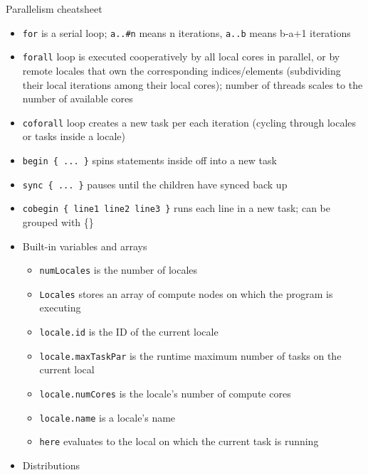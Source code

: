 \documentclass[10pt,xcolor=pdftex,dvipsnames,table]{beamer}
\newcommand{\tc}{\textcolor}
\begin{document}
\begin{frame}{Parallelism cheatsheet}
  {\let\normalsize\footnotesize \normalsize
    \begin{itemize}\setlength{\itemsep}{0.3mm}
    \item \tc{Mahogany}{\texttt{for}} is a serial loop; \quad\tc{Mahogany}{\texttt{a..\#n}} means n
      iterations, \quad\tc{Mahogany}{\texttt{a..b}} means b-a+1 iterations
    \item \tc{Mahogany}{\texttt{forall}} loop is executed cooperatively by all local cores in parallel,
      or by remote locales that own the corresponding indices/elements (subdividing their local
      iterations among their local cores); number of threads scales to the number of available cores
    \item \tc{Mahogany}{\texttt{coforall}} loop creates a new task per each iteration (cycling through
      locales or tasks inside a locale)
    \item \tc{Mahogany}{\texttt{begin \{ ... \}}} spins statements inside off into a new task
    \item \tc{Mahogany}{\texttt{sync \{ ... \}}} pauses until the children have synced back up
    \item \tc{Mahogany}{\texttt{cobegin \{ line1 line2 line3 \}}} runs each line in a new task; can be
      grouped with \{\}
    \item Built-in variables and arrays
      {\let\small\scriptsize
        \begin{itemize}\setlength{\itemsep}{0.1mm}
        \item \tc{Mahogany}{\texttt{numLocales}} is the number of locales
        \item \tc{Mahogany}{\texttt{Locales}} stores an array of compute nodes on which the program is
          executing
        \item \tc{Mahogany}{\texttt{locale.id}} is the ID of the current locale
        \item \tc{Mahogany}{\texttt{locale.maxTaskPar}} is the runtime maximum number of tasks on the
          current local
        \item \tc{Mahogany}{\texttt{locale.numCores}} is the locale's number of compute cores
        \item \tc{Mahogany}{\texttt{locale.name}} is a locale's name
        \item \tc{Mahogany}{\texttt{here}} evaluates to the local on which the current task is running
        \end{itemize}}
    \item Distributions

\end{itemize}}
\end{frame}
\end{document}
